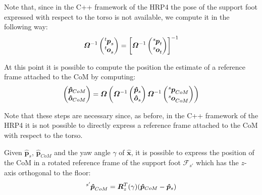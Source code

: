 \documentclass[a4paper]{article}
\begin{document}
Note that, since in the C++ framework of the HRP4 the pose of the support foot
expressed with respect to the torso is not available, we compute it in the
following way:
\begin{equation}
    \bm{\varOmega}^{-1}
    \begin{pmatrix}
        \tensor[^t]{\bm{p}}{_s} \\
        \tensor[^t]{\bm{o}}{_s}
    \end{pmatrix} =
    \left[\bm{\varOmega}^{-1}
    \begin{pmatrix}
        \tensor[^s]{\bm{p}}{_t} \\
        \tensor[^s]{\bm{o}}{_t}
    \end{pmatrix}\right]^{-1}
\end{equation}

At this point it is possible to compute the position the estimate of a
reference frame attached to the CoM by computing:
\begin{equation}
    \label{eq:pose-rf-com-world}
    \begin{pmatrix}
        \bm{\hat{p}}_{CoM} \\
        \bm{\hat{o}}_{CoM}
    \end{pmatrix} = \bm{\varOmega}\left(\bm{\varOmega}^{-1}
        \begin{pmatrix}
            \bm{\hat{p}}_s \\
            \bm{\hat{o}}_s
        \end{pmatrix}\bm{\varOmega}^{-1}
        \begin{pmatrix}
            \tensor[^s]{\bm{p}}{_{CoM}} \\
            \tensor[^s]{\bm{o}}{_{CoM}}
        \end{pmatrix}
    \right)
\end{equation}

Note that these steps are necessary since, as before, in the C++ framework of the
HRP4 it is not possible to directly express a reference frame attached to the CoM with
respect to the torso.

Given $\bm{\hat{p}}_{s}$, $\bm{\hat{p}}_{CoM}$ and the yaw angle $\gamma$ of
$\bm{\hat{x}}$, it is possible to express the position of the CoM in a rotated
reference frame of the support foot $\mathcal{F}_{s'}$ which has the $z$-axis
orthogonal to the floor:
\begin{equation}
    \tensor[^{s'}]{\bm{\hat{p}}}{_{CoM}} = \bm{R}^{T}_{z}(\gamma)(\bm{\hat{p}}_{CoM}-\bm{\hat{p}}_{s})
\end{equation}
\end{document}

